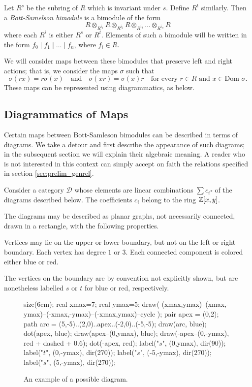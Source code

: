 Let $R^s$ be the subring of $R$ which is invariant under $s$.  Define $R^t$ similarly.  Then a \emph{Bott-Samelson bimodule} is a bimodule of the form
\[ R \otimes_{R^{i_1}} R \otimes_{R^{i_2}} R \otimes_{R^{i_3}} \dots \otimes_{R^{i_n}} R \]
where each $R^i$ is either $R^s$ or $R^t$.   Elements of such a bimodule will be written in the form $f_0 \mid f_1 \mid \dots \mid f_n$, where $f_i \in R$.

We will consider maps between these bimodules that preserve left and right actions; that is, we consider the maps $\sigma$ such that
\begin{equation}
	\sigma(rx) = r\sigma(x) \quad\text{and}\quad \sigma(xr) = \sigma(x)r \quad\text{for every $r \in R$ and $x \in \text{Dom } \sigma$}.
	\label{eq:respect}
\end{equation}
These maps can be represented using diagrammatics, as below.

\subsection{Diagrammatics of Maps}
\label{sec:prelim_map}
\newcommand{\DD}{\mathcal D}
Certain maps between Bott-Samleson bimodules can be described in terms of diagrams.  We take a detour and first describe the appearance of such diagrams; in the subsequent section we will explain their algebraic meaning.  A reader who is not interested in this context can simply accept on faith the relations specified in section \ref{sec:prelim_genrel}.

Consider a category $\DD$ whose elements are linear combinations $\sum c_i \square$ of the diagrams described below.  The coefficients $c_i$ belong to the ring $\mathbb Z[x,y]$.

The diagrams may be described as planar graphs, not necessarily connected, drawn in a rectangle, with the following properties.
\begin{enumerate}[(i)]
	\ii Vertices may lie on the upper or lower boundary, but not on the left or right boundary.
	\ii Each vertex has degree $1$ or $3$.
	\ii Each connected component is colored either blue or red.
\end{enumerate}
The vertices on the boundary are by convention not explicitly shown, but are nonetheless labelled $s$ or $t$ for blue or red, respectively.

\begin{figure}[ht]
	\centering
	\begin{asy}
	size(6cm);
	real xmax=7;
	real ymax=5;
	draw( (xmax,ymax)--(xmax,-ymax)--(-xmax,-ymax)--(-xmax,ymax)--cycle );
	pair apex = (0,2);
	path arc = (5,-5)..(2,0)..apex..(-2,0)..(-5,-5);
	draw(arc, blue);
	dot(apex, blue);
	draw(apex--(0,ymax), blue);
	draw(-apex--(0,-ymax), red + dashed + 0.6);
	dot(-apex, red);
	label("$s$", (0,ymax), dir(90));
	label("$t$", (0,-ymax), dir(270));
	label("$s$", (-5,-ymax), dir(270));
	label("$s$", (5,-ymax), dir(270));
	\end{asy}
	\caption{An example of a possible diagram.}
	\label{fig:example_diagram}
\end{figure}

